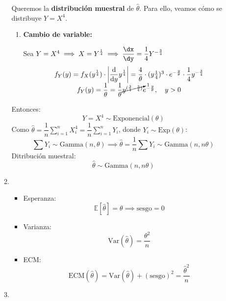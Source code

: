 \begin{enumerate}[label=\color{red}\textbf{\arabic*)}]
\begin{enumerate}[label=\color{red}\textbf{\alph*)}]
            Queremos la \textbf{distribución muestral} de $\hat{\theta}$. Para ello, veamos cómo se distribuye $Y=X^4$.
            \begin{enumerate}[label=\arabic*)]
                \item \textbf{Cambio de variable:}

                    Sea $Y=X^4\implies X=Y^{\frac{1}{4}}\implies \dfrac{\dx }{\dy}=\dfrac{1}{4}Y^{-\frac{3}{4} }$ 
                    \[
                    \begin{array}{c}
                        f_Y(y)=f_X(y^{\frac{1}{4} })\cdot \left| \dfrac{\mathrm{d}}{\mathrm{d}y} y^{\frac{1}{4} }\right| =\dfrac{4}{\theta}\cdot (y\frac{1}{4} )^3\cdot e^{-\frac{y}{\theta} } \cdot \dfrac{1}{4}y^{-\frac{3}{4} }\\
                        f_Y(y)=\dfrac{1}{\theta}=\dfrac{1}{\theta}\cancelto{1}{y^{(\frac{3}{4} -\frac{3}{4} )}} e^{-\frac{y}{\theta} } ,\quad y>0
                    \end{array}
                    \] 
            \end{enumerate}
            Entonces: \[
            Y=X^4\sim \text{Exponencial}(\theta)
            \] 
            Como $\hat{\theta}=\dfrac{1}{n}\sum_{i=1}^{n} X_i^4=\dfrac{1}{n}\sum_{i=1}^{n} Y_i$, donde $Y_i\sim \text{Exp}(\theta)$: \[
            \sum Y_i\sim \text{Gamma}(n,\theta)\implies \hat{\theta}=\dfrac{1}{n}\sum Y_i\sim \text{Gamma}(n,n\theta)
            \] 
            Ditribución muestral: \[
            \hat{\theta}\sim \text{Gamma}(n,n\theta)
            \] 
        \item {}
            \begin{itemize}[label=\textbullet]
                \item Esperanza: \[
                        \mathbb{E}[\hat{\theta}]=\theta\implies\text{sesgo}=0
                \] 
            \item Varianza: \[
            \text{Var}(\hat{\theta})=\dfrac{\theta^2}{n}
            \] 
        \item ECM: \[
        \mathrm{ECM}(\hat{\theta})=\mathrm{Var}(\hat{\theta})+(\text{sesgo})^2=\dfrac{\hat{\theta}^2}{n}
        \] 
            \end{itemize}
        \item {}


\end{enumerate}
\end{enumerate}
